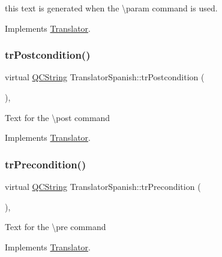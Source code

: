 this text is generated when the \textbackslash{}param command is used. 

Implements \mbox{\hyperlink{class_translator}{Translator}}.

\mbox{\label{class_translator_spanish_ae446a3ca65f16ceb9529cd455315c05a}} 
\subsubsection{\texorpdfstring{trPostcondition()}{trPostcondition()}}
{\footnotesize\ttfamily virtual \mbox{\hyperlink{class_q_c_string}{Q\+C\+String}} Translator\+Spanish\+::tr\+Postcondition (\begin{DoxyParamCaption}{ }\end{DoxyParamCaption})\hspace{0.3cm}{\ttfamily [inline]}, {\ttfamily [virtual]}}

Text for the \textbackslash{}post command 

Implements \mbox{\hyperlink{class_translator}{Translator}}.

\mbox{\label{class_translator_spanish_a1589009f7db597274398ea5155abe6ff}} 
\subsubsection{\texorpdfstring{trPrecondition()}{trPrecondition()}}
{\footnotesize\ttfamily virtual \mbox{\hyperlink{class_q_c_string}{Q\+C\+String}} Translator\+Spanish\+::tr\+Precondition (\begin{DoxyParamCaption}{ }\end{DoxyParamCaption})\hspace{0.3cm}{\ttfamily [inline]}, {\ttfamily [virtual]}}

Text for the \textbackslash{}pre command 

Implements \mbox{\hyperlink{class_translator}{Translator}}.

\mbox{\label{class_translator_spanish_a2e4d6890f0641d6170352e623ee2f962}} 
